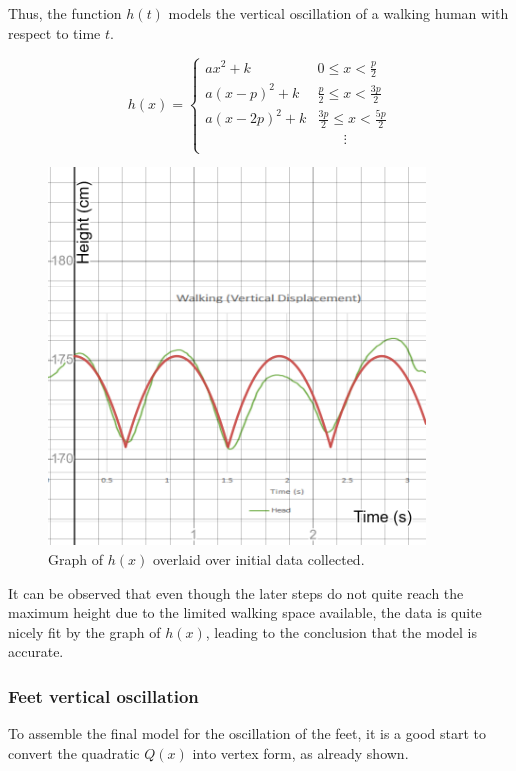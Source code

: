 \documentclass[12pt, a4paper]{article}
\begin{document}
Thus, the function $h(t)$ models the vertical oscillation of a walking human with
respect to time $t$.

\[ h(x)= \begin{cases}
        ax^2 + k      & 0            \leq x < \frac{ p}{2} \\
        a(x-p)^2 + k  & \frac{p}{2}  \leq x < \frac{3p}{2} \\
        a(x-2p)^2 + k & \frac{3p}{2} \leq x < \frac{5p}{2} \\
                      & \phantom{t=\,} \vdots              \\
    \end{cases}
\]

\begin{figure}[H]
    \centering
    \includegraphics[width=10cm]{final_graph.png}
    \caption{ Graph of $h(x)$ overlaid over initial data collected.}
    \label{final_graph}
\end{figure}

It can be observed that even though the later steps do not quite reach the
maximum height due to the limited walking space available, the data is quite
nicely fit by the graph of $h(x)$, leading to the conclusion that the model is
accurate.

\subsubsection{Feet vertical oscillation}
To assemble the final model for the oscillation of the feet, it is a good start
to convert the quadratic $Q(x)$ into vertex form, as already shown.
\end{document}
